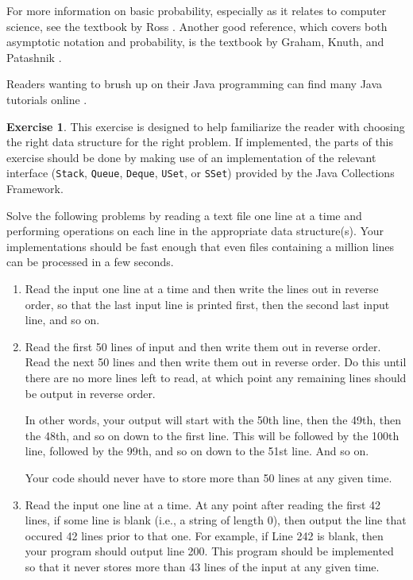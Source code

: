 \documentclass[10pt]{book}
\newcommand{\cpponly}[1]{}\newcommand{\javaonly}[1]{#1}\newcommand{\pcodeonly}[1]{}\newcommand{\notpcode}[1]{#1}\newcommand{\lang}{Java}
\theoremstyle{plain}
\theoremstyle{definition}
\newtheorem{exc}{Exercise}[chapter]
\begin{document}
For more information on basic probability, especially as it relates to
computer science, see the textbook by Ross \cite{r01}.  Another good
reference, which covers both asymptotic notation and probability, is
the textbook by Graham, Knuth, and Patashnik \cite{gkp94}.

\javaonly{Readers wanting to brush up on their Java programming can find
many Java tutorials online \cite{oracle_tutorials}.}

\begin{exc}
  This exercise is designed to help familiarize the reader with choosing
  the right data structure for the right problem.  If implemented, the
  parts of this exercise should be done by making use of an implementation
  of the relevant interface (\texttt{Stack}, \texttt{Queue}, \texttt{Deque}, \texttt{USet}, or \texttt{SSet})
  provided by the \javaonly{Java Collections Framework}\cpponly{C++
  Standard Template Library}.

  Solve the following problems by reading a text file one line at a
  time and performing operations on each line in the appropriate data
  structure(s).  Your implementations should be fast enough that even
  files containing a million lines can be processed in a few seconds.
  \begin{enumerate}
    \item Read the input one line at a time and then write the lines out
      in reverse order, so that the last input line is printed first,
      then the second last input line, and so on.

    \item  Read the first 50 lines of input and then write them out in
      reverse order. Read the next 50 lines and then write them out in
      reverse order. Do this until there are no more lines left to read,
      at which point any remaining lines should be output in reverse
      order.

      In other words, your output will start with the 50th line, then
      the 49th, then the 48th, and so on down to the first line. This
      will be followed by the 100th line, followed by the 99th, and so
      on down to the 51st line. And so on.
      
      Your code should never have to store more than 50 lines at any
      given time.

    \item Read the input one line at a time.
      At any point after reading the first 42 lines, if some line is blank
      (i.e., a string of length 0), then output the line that occured
      42 lines prior to that one. For example, if Line 242 is blank,
      then your program should output line 200. This program should
      be implemented so that it never stores more than 43 lines of the
      input at any given time.


\end{enumerate}
\end{exc}
\end{document}
